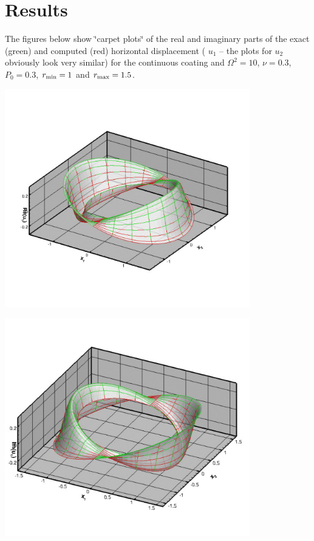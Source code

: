  

\hypertarget{index_results}{}\section{Results}\label{index_results}
The figures below show \char`\"{}carpet plots\char`\"{} of the real and imaginary parts of the exact (green) and computed (red) horizontal displacement ( $ u_1 $ -- the plots for $ u_2 $ obviously look very similar) for the continuous coating and $ \Omega^2=10 $, $ \nu=0.3 $, $ P_0 = 0.3 $, $ r_{\rm min}=1$ and $ r_{\rm max}=1.5 $.

 
\begin{DoxyImage}
\includegraphics[width=0.8\textwidth]{re_ux}
\end{DoxyImage}


 
\begin{DoxyImage}
\includegraphics[width=0.8\textwidth]{im_ux}
\end{DoxyImage}


